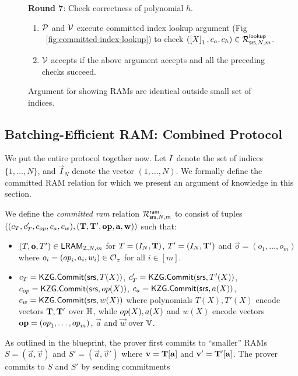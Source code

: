 \begin{figure}[htbp]
\begin{mdframed}
        {\bf Round 7}: Check correctness of polynomial $h$.
        \begin{enumerate}[leftmargin=1em, label=\arabic*.]
        \item $\mathcal{P}$ and $\mathcal{V}$ execute committed index lookup argument (Fig ~\ref{fig:committed-index-lookup})
        to check $(\left[{X}\right]_1,c_a,c_h)\in \mathcal{R}^{\mathsf{lookup}}_{\mathsf{srs},N,m}$.
        \item $\mathcal{V}$ accepts if the above argument accepts and all the preceding checks succeed.
        \end{enumerate}
    \end{mdframed}
    \caption{Argument for showing RAMs are identical outside small set of indices.}
    \label{fig:a-identical}
\end{figure}

\subsection{Batching-Efficient RAM: Combined Protocol}\label{subsec:all-together}
We put the entire protocol together now. Let $I$ denote the set of indices $\{1,\ldots,N\}$, and $\vec{I}_N$
denote the vector $(1,\ldots,N)$. We formally define the committed RAM relation for which we present an argument of
knowledge in this section.
\begin{definition}\label{defn:committed-ram}
We define the {\em committed ram} relation
$\mathcal{R}^{\mathsf{ram}}_{\mathsf{srs},N,m}$ to consist of tuples $((c_T, c_T', c_{op}, c_a, c_w),(\mathbf{T}, \mathbf{T}',\mathbf{{op}},\mathbf{a},\mathbf{w}))$
such that:
\begin{itemize}[leftmargin=1em]
    \item $(T,\mathbf{o},T')\in \mathsf{LRAM}_{\mathcal{I},N,m}$ for $T=(I_N,\mathbf{T})$, $T'=(I_N,\mathbf{T}')$ and $\vec{o}=(o_1,\ldots,o_m)$
    where $o_i=({op}_i, a_i, w_i)\in \mathcal{O}_{{}_\mathcal{I}}$ for all $i\in [m]$.
    \item $c_T=\mathsf{KZG.Commit}(\mathsf{srs}, T(X))$, $c_T'=\mathsf{KZG.Commit}(\mathsf{srs}, T'(X))$, $c_{op} = \mathsf{KZG.Commit}(\mathsf{srs},{op}(X))$,  $c_a=\mathsf{KZG.Commit}(\mathsf{srs}, a(X))$,
    $c_w = \mathsf{KZG.Commit}(\mathsf{srs}, w(X))$ where polynomials $T(X), T'(X)$ encode vectors $\mathbf{T}, \mathbf{T}'$ over $\mathbb{H}$, while ${op}(X), a(X)$ and
    $w(X)$ encode vectors $\mathbf{{op}}=({op}_1,\ldots,{op}_m)$, $\vec{a}$ and $\vec{w}$ over $\mathbb{V}$.
\end{itemize}
\end{definition}
As outlined in the blueprint, the prover first commits to ``smaller'' RAMs $S=(\vec{a},\vec{v})$ and $S'=(\vec{a},\vec{v}')$
where $\mathbf{v}=\mathbf{T}[\mathbf{a}]$ and $\mathbf{v}'=\mathbf{T}'[\mathbf{a}]$. The prover commits to $S$ and $S'$ by sending commitments
